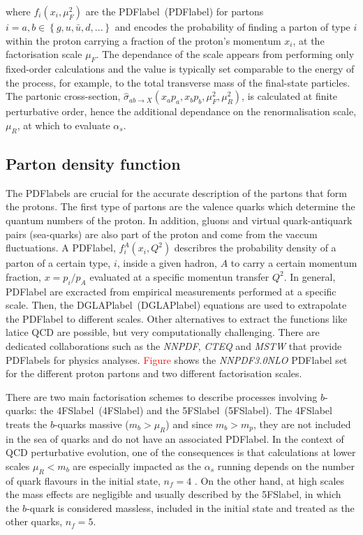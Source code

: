 where $f_i(x_i,\mu_F^2)$ are the \acrlong{PDFlabel}~(\acrshort{PDFlabel}) for partons $i=a,b\in\left\{g, u, \bar{u}, d, ...\right\}$ and encodes the probability of finding a parton of type $i$ within the proton carrying a fraction of the proton's momentum $x_i$, at the factorisation scale $\mu_F$. The dependance of the scale appears from performing only fixed-order calculations and the value is typically set comparable to the energy of the process, for example, to the total transverse mass of the final-state particles. The partonic cross-section, $\hat{\sigma}_{ab\to X}(x_a p_a,x_b p_b,\mu_F^2,\mu_R^2)$, is calculated at finite perturbative order, hence the additional dependance on the renormalisation scale, $\mu_R$, at which to evaluate $\alpha_s$.

\subsection{Parton density function}

The \acrshort{PDFlabel}s are crucial for the accurate description of the partons that form the protons. The first type of partons are the valence quarks which determine the quantum numbers of the proton. In addition, gluons and virtual quark-antiquark pairs (sea-quarks) are also part of the proton and come from the vaccum fluctuations. A \acrshort{PDFlabel}, $f_i^A(x_i,Q^2)$ describres the probability density of a parton of a certain type, $i$, inside a given hadron, $A$ to carry a certain momentum fraction, $x=p_i/p_A$ evaluated at a specific momentun transfer $Q^2$. In general, \acrshort{PDFlabel} are excracted from empirical measurements performed at a specific scale. Then, the \acrlong{DGLAPlabel}~(\acrshort{DGLAPlabel}) equations are used to extrapolate the \acrshort{PDFlabel} to different scales. Other alternatives to extract the functions like latice \acrshort{QCD} are possible, but very computationally challenging. %
There are dedicated collaborations such as the \textit{NNPDF}, \textit{CTEQ} and \textit{MSTW} that provide %
 \acrshort{PDFlabel}s for physics analyses. \textcolor{red}{Figure} shows the \textit{NNPDF3.0NLO} \acrshort{PDFlabel} set for the different proton partons and two different factorisation scales.

 There are two main factorisation schemes to describe processes involving $b$-quarks: the \acrlong{4FSlabel}~(\acrshort{4FSlabel}) and the \acrlong{5FSlabel}~(\acrshort{5FSlabel}). The \acrshort{4FSlabel} treats the $b$-quarks massive ($m_b>\mu_R$) and since $m_b>m_p$, they are not included in the sea of quarks and do not have an associated \acrshort{PDFlabel}. In the context of \acrshort{QCD} perturbative evolution, one of the consequences is that calculations at lower scales $\mu_R<m_b$ are especially impacted as the $\alpha_s$ running depends on the number of quark flavours in the initial state, $n_f=4$ . On the other hand, at high scales the mass effects are negligible and usually described by the \acrshort{5FSlabel}, in which the $b$-quark is considered massless, included in the initial state and treated as the other quarks, $n_f=5$. 



